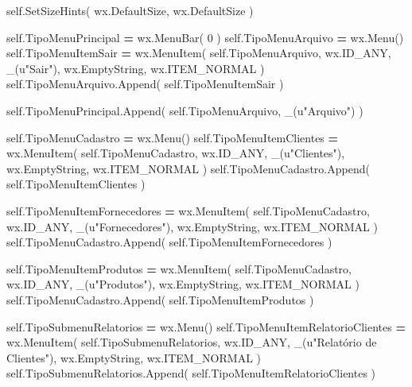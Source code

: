 \documentclass[
]{book}
\newenvironment{Shaded}{\begin{snugshade}}{\end{snugshade}}
\newcommand{\DecValTok}[1]{\textcolor[rgb]{0.00,0.00,0.81}{#1}}
\newcommand{\NormalTok}[1]{#1}
\newcommand{\OperatorTok}[1]{\textcolor[rgb]{0.81,0.36,0.00}{\textbf{#1}}}
\newcommand{\StringTok}[1]{\textcolor[rgb]{0.31,0.60,0.02}{#1}}
\newcommand{\VariableTok}[1]{\textcolor[rgb]{0.00,0.00,0.00}{#1}}
\begin{document}
\begin{Shaded}
\begin{Highlighting}[]
       \VariableTok{self}\NormalTok{.SetSizeHints( wx.DefaultSize, wx.DefaultSize )}

       \VariableTok{self}\NormalTok{.TipoMenuPrincipal }\OperatorTok{=}\NormalTok{ wx.MenuBar( }\DecValTok{0}\NormalTok{ )}
       \VariableTok{self}\NormalTok{.TipoMenuArquivo }\OperatorTok{=}\NormalTok{ wx.Menu()}
       \VariableTok{self}\NormalTok{.TipoMenuItemSair }\OperatorTok{=}\NormalTok{ wx.MenuItem( }\VariableTok{self}\NormalTok{.TipoMenuArquivo, wx.ID\_ANY, \_(}\StringTok{u"Sair"}\NormalTok{), wx.EmptyString, wx.ITEM\_NORMAL )}
       \VariableTok{self}\NormalTok{.TipoMenuArquivo.Append( }\VariableTok{self}\NormalTok{.TipoMenuItemSair )}

       \VariableTok{self}\NormalTok{.TipoMenuPrincipal.Append( }\VariableTok{self}\NormalTok{.TipoMenuArquivo, \_(}\StringTok{u"Arquivo"}\NormalTok{) )}

       \VariableTok{self}\NormalTok{.TipoMenuCadastro }\OperatorTok{=}\NormalTok{ wx.Menu()}
       \VariableTok{self}\NormalTok{.TipoMenuItemClientes }\OperatorTok{=}\NormalTok{ wx.MenuItem( }\VariableTok{self}\NormalTok{.TipoMenuCadastro, wx.ID\_ANY, \_(}\StringTok{u"Clientes"}\NormalTok{), wx.EmptyString, wx.ITEM\_NORMAL )}
       \VariableTok{self}\NormalTok{.TipoMenuCadastro.Append( }\VariableTok{self}\NormalTok{.TipoMenuItemClientes )}

       \VariableTok{self}\NormalTok{.TipoMenuItemFornecedores }\OperatorTok{=}\NormalTok{ wx.MenuItem( }\VariableTok{self}\NormalTok{.TipoMenuCadastro, wx.ID\_ANY, \_(}\StringTok{u"Fornecedores"}\NormalTok{), wx.EmptyString, wx.ITEM\_NORMAL )}
       \VariableTok{self}\NormalTok{.TipoMenuCadastro.Append( }\VariableTok{self}\NormalTok{.TipoMenuItemFornecedores )}

       \VariableTok{self}\NormalTok{.TipoMenuItemProdutos }\OperatorTok{=}\NormalTok{ wx.MenuItem( }\VariableTok{self}\NormalTok{.TipoMenuCadastro, wx.ID\_ANY, \_(}\StringTok{u"Produtos"}\NormalTok{), wx.EmptyString, wx.ITEM\_NORMAL )}
       \VariableTok{self}\NormalTok{.TipoMenuCadastro.Append( }\VariableTok{self}\NormalTok{.TipoMenuItemProdutos )}

       \VariableTok{self}\NormalTok{.TipoSubmenuRelatorios }\OperatorTok{=}\NormalTok{ wx.Menu()}
       \VariableTok{self}\NormalTok{.TipoMenuItemRelatorioClientes }\OperatorTok{=}\NormalTok{ wx.MenuItem( }\VariableTok{self}\NormalTok{.TipoSubmenuRelatorios, wx.ID\_ANY, \_(}\StringTok{u"Relatório de Clientes"}\NormalTok{), wx.EmptyString, wx.ITEM\_NORMAL )}
       \VariableTok{self}\NormalTok{.TipoSubmenuRelatorios.Append( }\VariableTok{self}\NormalTok{.TipoMenuItemRelatorioClientes )}


\end{Highlighting}
\end{Shaded}
\end{document}
